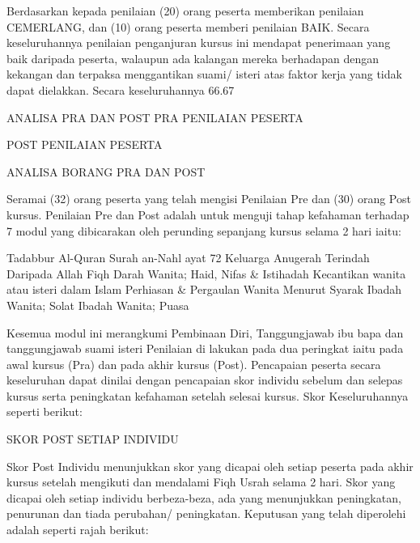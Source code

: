Berdasarkan kepada penilaian (20) orang peserta memberikan penilaian CEMERLANG, dan (10) orang peserta memberi penilaian BAIK. Secara keseluruhannya penilaian penganjuran kursus ini mendapat penerimaan yang baik daripada peserta, walaupun ada kalangan mereka berhadapan dengan kekangan dan terpaksa menggantikan suami/ isteri atas faktor kerja yang tidak dapat dielakkan. Secara keseluruhannya 66.67%

ANALISA PRA DAN POST
PRA PENILAIAN PESERTA




POST PENILAIAN PESERTA




ANALISA BORANG PRA DAN POST

Seramai (32) orang peserta yang telah mengisi Penilaian Pre dan (30) orang Post kursus. Penilaian Pre dan Post adalah untuk menguji tahap kefahaman terhadap 7 modul yang dibicarakan oleh perunding sepanjang kursus selama 2 hari iaitu:

Tadabbur Al-Quran Surah an-Nahl ayat 72
Keluarga Anugerah Terindah Daripada Allah
Fiqh Darah Wanita; Haid, Nifas & Istihadah
Kecantikan wanita atau isteri dalam Islam
Perhiasan & Pergaulan Wanita Menurut Syarak
Ibadah Wanita; Solat
Ibadah Wanita; Puasa



Kesemua modul ini merangkumi Pembinaan Diri, Tanggungjawab ibu bapa dan tanggungjawab suami isteri Penilaian di lakukan pada dua peringkat iaitu pada awal kursus (Pra) dan pada akhir kursus (Post). Pencapaian peserta secara keseluruhan dapat dinilai dengan pencapaian skor individu sebelum dan selepas kursus serta peningkatan kefahaman setelah selesai kursus. Skor Keseluruhannya seperti berikut:






SKOR POST SETIAP INDIVIDU

Skor Post Individu menunjukkan skor yang dicapai oleh setiap peserta pada akhir kursus setelah mengikuti dan mendalami Fiqh Usrah selama 2 hari. Skor yang dicapai oleh setiap individu berbeza-beza, ada yang menunjukkan peningkatan, penurunan dan tiada perubahan/ peningkatan. Keputusan yang telah diperolehi adalah seperti rajah berikut:
















